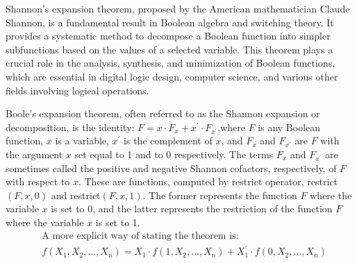     Shannon's expansion theorem, proposed by the American mathematician Claude Shannon, is a fundamental result in Boolean algebra and switching theory. 
    It provides a systematic method to decompose a Boolean function into simpler subfunctions based on the values of a selected variable. 
    This theorem plays a crucial role in the analysis, synthesis, and minimization of Boolean functions, which are essential in digital logic design, computer 
    science, and various other fields involving logical operations.

    \begin{theorem}
        Boole's expansion theorem, often referred to as the Shannon expansion or decomposition, is the identity: $F=x\cdot\dot{F}_x+x^{\prime}\cdot F_{x^{\prime}}$,where $F$ is any Boolean function, $x$ is a variable, $x^{\prime}$ is the complement of $x$, and $F_x$ and $F_{x^{\prime}}$ are $F$
        with the argument $x$ set equal to 1 and to 0 respectively.
        The terms $F_x$ and $F_{x^{\prime}}$ are sometimes called the positive and negative Shannon cofactors, respectively, of $F$ with respect to
        $x$. These are functions, computed by restrict operator, restrict$(F,x,0)$ and restrict$(F,x,1)$. The former represents  the function $F$ where the variable $x$  
        is set to 0, and the latter represents the restriction of the function $F$ where the variable $x$ is set to 1.
        $$\begin{aligned}&\text{A more explicit way of stating the theorem is:}\\&f(X_1,X_2,\ldots,X_n)=X_1\cdot f(1,X_2,\ldots,X_n)+X_1^{\prime}\cdot f(0,X_2,\ldots,X_n)\end{aligned}$$
    \end{theorem}
